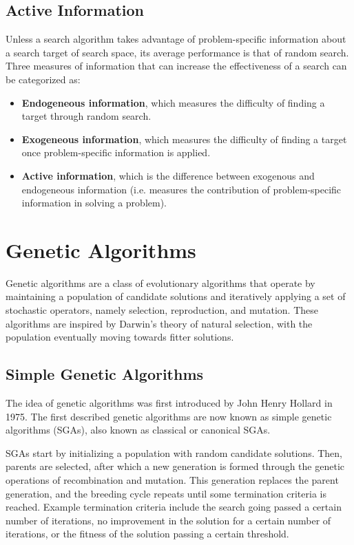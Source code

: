 \documentclass[12pt,titlepage]{article}
\let\stdsection\section
\renewcommand\section{\clearpage\stdsection}
\begin{document}
    \subsection{Active Information}
      Unless a search algorithm takes advantage of problem-specific information about a search target of search space, its average performance is that of random search. Three measures of
      information that can increase the effectiveness of a search can be categorized as:
      \begin{itemize}
        \item \textbf{Endogeneous information}, which measures the difficulty of finding a target through random search.
        \item \textbf{Exogeneous information}, which measures the difficulty of finding a target once problem-specific information is applied.
        \item \textbf{Active information}, which is the difference between exogenous and endogeneous information (i.e. measures the contribution of problem-specific information in solving
          a problem).
      \end{itemize}

  \section{Genetic Algorithms}
    Genetic algorithms are a class of evolutionary algorithms that operate by maintaining a population of candidate solutions and iteratively applying a set of stochastic operators,
    namely selection, reproduction, and mutation. These algorithms are inspired by Darwin's theory of natural selection, with the population eventually moving towards fitter solutions.

    \subsection{Simple Genetic Algorithms}
      The idea of genetic algorithms was first introduced by John Henry Hollard in 1975. The first described genetic algorithms are now known as simple genetic
      algorithms (SGAs), also known as classical or canonical SGAs.

      SGAs start by initializing a population with random candidate solutions. Then, parents are selected, after which a new generation is formed through the genetic operations of
      recombination and mutation. This generation replaces the parent generation, and the breeding cycle repeats until some termination criteria is reached. Example termination
      criteria include the search going passed a certain number of iterations, no improvement in the solution for a certain number of iterations, or the fitness of the solution
      passing a certain threshold.
\end{document}
